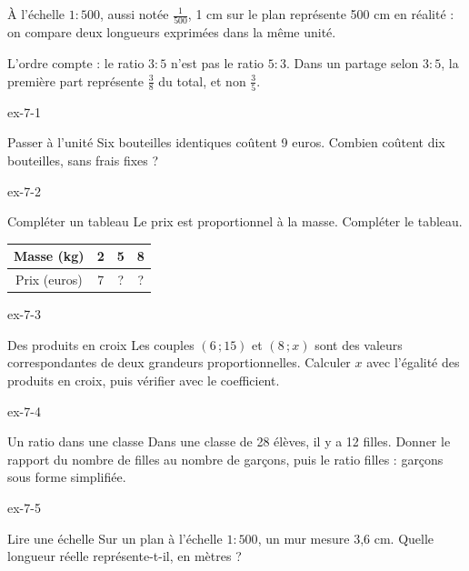 \begin{exemple}À l’échelle $1:500$, aussi notée $\frac1{500}$, 1 cm sur le plan représente 500 cm en réalité : on compare deux longueurs exprimées dans la même unité.\end{exemple}
\begin{attention}L’ordre compte : le ratio $3:5$ n’est pas le ratio $5:3$. Dans un partage selon $3:5$, la première part représente $\frac38$ du total, et non $\frac35$.\end{attention}

\clearpage{}
\begin{blocLivre}{ex-7-1}\begin{exercice}[1]{Passer à l’unité}
Six bouteilles identiques coûtent 9 euros. Combien coûtent dix bouteilles, sans frais fixes ?
\end{exercice}\end{blocLivre}
\begin{blocLivre}{ex-7-2}\begin{exercice}[1]{Compléter un tableau}
Le prix est proportionnel à la masse. Compléter le tableau.\begin{center}\renewcommand{\arraystretch}{1.35}\begin{tabular}{c|ccc}\toprule
Masse (kg) & 2 & 5 & 8\\\midrule
Prix (euros) & 7 & ? & ?\\
\bottomrule\end{tabular}\end{center}
\end{exercice}\end{blocLivre}
\begin{blocLivre}{ex-7-3}\begin{exercice}[1]{Des produits en croix}
Les couples $(6\,;15)$ et $(8\,;x)$ sont des valeurs correspondantes de deux grandeurs proportionnelles. Calculer $x$ avec l’égalité des produits en croix, puis vérifier avec le coefficient.
\end{exercice}\end{blocLivre}
\begin{blocLivre}{ex-7-4}\begin{exercice}[1]{Un ratio dans une classe}
Dans une classe de 28 élèves, il y a 12 filles. Donner le rapport du nombre de filles au nombre de garçons, puis le ratio filles : garçons sous forme simplifiée.
\end{exercice}\end{blocLivre}
\begin{blocLivre}{ex-7-5}\begin{exercice}[1]{Lire une échelle}
Sur un plan à l’échelle $1:500$, un mur mesure 3,6 cm. Quelle longueur réelle représente-t-il, en mètres ?
\end{exercice}\end{blocLivre}

